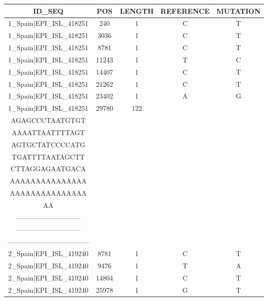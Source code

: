 \documentclass[a4paper,10pt]{article}
\begin{document}
\begin{longtable}{@{}ccccc@{}}
\toprule
\textbf{ID\_SEQ} & \textbf{POS} & \textbf{LENGTH} & \textbf{REFERENCE} & \textbf{MUTATION} \\* \midrule
\endfirsthead
%
\cline{1-5}
\endhead
%
1\_Spain|EPI\_ISL\_418251 & 240 & 1 & C & T \\* \midrule
1\_Spain|EPI\_ISL\_418251 & 3036 & 1 & C & T \\* \midrule
1\_Spain|EPI\_ISL\_418251 & 8781 & 1 & C & T \\* \midrule
1\_Spain|EPI\_ISL\_418251 & 11243 & 1 & T & C \\* \midrule
1\_Spain|EPI\_ISL\_418251 & 14407 & 1 & C & T \\* \midrule
1\_Spain|EPI\_ISL\_418251 & 21262 & 1 & C & T \\* \midrule
1\_Spain|EPI\_ISL\_418251 & 23402 & 1 & A & G \\* \midrule
1\_Spain|EPI\_ISL\_418251 & 29780 & 122 & \begin{tabular}[c]{@{}c@{}}AGCTGCCTATATGGA\\ AGAGCCCTAATGTGT\\ AAAATTAATTTTAGT\\ AGTGCTATCCCCATG\\ TGATTTTAATAGCTT\\ CTTAGGAGAATGACA\\ AAAAAAAAAAAAAAA\\ AAAAAAAAAAAAAAA\\ AA\end{tabular} & \begin{tabular}[c]{@{}c@{}}----------------------------\\ -----------------------------\\ -----------------------------\\ ------------------------------------\end{tabular} \\* \midrule
2\_Spain|EPI\_ISL\_419240 & 8781 & 1 & C & T \\* \midrule
2\_Spain|EPI\_ISL\_419240 & 9476 & 1 & T & A \\* \midrule
2\_Spain|EPI\_ISL\_419240 & 14804 & 1 & C & T \\* \midrule
2\_Spain|EPI\_ISL\_419240 & 25978 & 1 & G & T \\* \midrule

\end{longtable}
\end{document}
